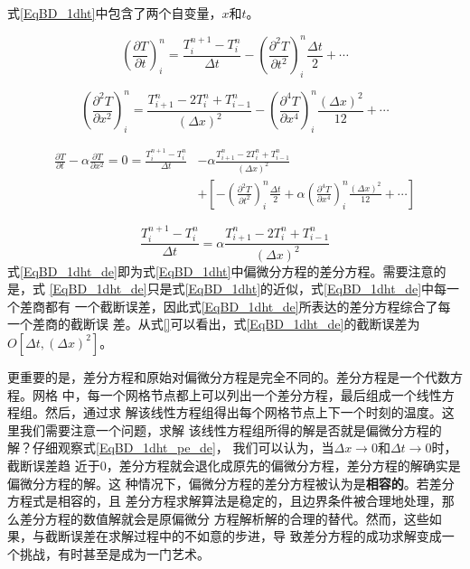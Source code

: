 式\eqref{EqBD_1dht}中包含了两个自变量，$x$和$t$。

\begin{equation}
  \left(
    \frac{\partial T}{\partial t}
  \right)_{i}^{n}
  =
  \frac{T_{i}^{n+1}-T_{i}^{n}}{\Delta t}
  -
  \left(
    \frac{\partial^{2} T}{\partial t^{2}}
  \right)_{i}^{n}
  \frac{\Delta t}{2}
  +
  \cdots
\end{equation}

\begin{equation}
  \left(
    \frac{\partial^{2} T}{\partial x^{2}}
  \right)_{i}^{n}
  =
  \frac{T_{i+1}^{n}-2T_{i}^{n}+T_{i-1}^{n}}{(\Delta x)^2}
  -
  \left(
    \frac{\partial^{4} T}{\partial x^{4}}
  \right)_{i}^{n}
  \frac{(\Delta x)^{2}}{12}
  +
  \cdots
\end{equation}

\begin{equation}
  \begin{aligned}
    \frac{\partial T}{\partial t}
    -
    \alpha
    \frac{\partial T}{\partial x^{2}}
    =
    0
    =
    \frac{T_{i}^{n+1}-T_{i}^{n}}{\Delta t}
    &-
    \alpha\frac{T_{i+1}^{n}-2T_{i}^{n}+T_{i-1}^{n}}{(\Delta x)^2}
    \\
    &+
    \left[
      -
      \left(
        \frac{\partial^{2} T}{\partial t^{2}}
      \right)_{i}^{n}
      \frac{\Delta t}{2}
      +
      \alpha
      \left(
        \frac{\partial^{4} T}{\partial x^{4}}
      \right)_{i}^{n}
      \frac{(\Delta x)^{2}}{12}
      +
      \cdots
    \right]
  \end{aligned}
  \label{EqBD_1dht_pe_de}
\end{equation}

\begin{equation}
    \frac{T_{i}^{n+1}-T_{i}^{n}}{\Delta t}
    =
    \alpha\frac{T_{i+1}^{n}-2T_{i}^{n}+T_{i-1}^{n}}{(\Delta x)^2}
    \label{EqBD_1dht_de}
\end{equation}
式\eqref{EqBD_1dht_de}即为式\eqref{EqBD_1dht}中偏微分方程的差分方程。需要注意的是，式
\eqref{EqBD_1dht_de}只是式\eqref{EqBD_1dht}的近似，式\eqref{EqBD_1dht_de}中每一个差商都有
一个截断误差，因此式\eqref{EqBD_1dht_de}所表达的差分方程综合了每一个差商的截断误
差。从式\eqref{}可以看出，式\eqref{EqBD_1dht_de}的截断误差为$O[\Delta t, (\Delta
x)^{2}]$。

更重要的是，差分方程和原始对偏微分方程是完全不同的。差分方程是一个代数方程。网格
中，每一个网格节点都上可以列出一个差分方程，最后组成一个线性方程组。然后，通过求
解该线性方程组得出每个网格节点上下一个时刻的温度。这里我们需要注意一个问题，求解
该线性方程组所得的解是否就是偏微分方程的解？仔细观察式\eqref{EqBD_1dht_pe_de}，
我们可以认为，当$\Delta x \rightarrow 0$和$\Delta t \rightarrow 0$时，截断误差趋
近于0，差分方程就会退化成原先的偏微分方程，差分方程的解确实是偏微分方程的解。这
种情况下，偏微分方程的差分方程被认为是\textbf{相容的}。若差分方程式是相容的，且
差分方程求解算法是稳定的，且边界条件被合理地处理，那么差分方程的数值解就会是原偏微分
方程解析解的合理的替代。然而，这些如果，与截断误差在求解过程中的不如意的步进，导
致差分方程的成功求解变成一个挑战，有时甚至是成为一门艺术。

